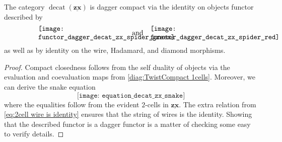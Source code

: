 \documentclass[a4paper,UKenglish]{lipics-v2016}
\begin{document}
\begin{theorem}
	\label{thm:decat zx is dagger compact}
	The category $\operatorname{decat}(\underline{\mathbf{zx}})$ is dagger compact via the identity on objects functor described by 
	\[
		\begin{minipage}{0.3\textwidth}
			\texttt{[image: functor\_dagger\_decat\_zx\_spider\_green]}
		\end{minipage}
		\quad \quad \quad \text{and} \quad
		\begin{minipage}{0.3\textwidth}
			\texttt{[image: functor\_dagger\_decat\_zx\_spider\_red]}
		\end{minipage}
	\]
	as well as by identity on the wire, Hadamard, and diamond morphisms.
\end{theorem}
\begin{proof}
	Compact closedness follows from the self duality of objects via the evaluation and coevaluation maps from \eqref{diag:TwistCompact 1cells}. Moreover, we can derive the snake equation
	\[
	\texttt{[image: equation\_decat\_zx\_snake]}
	\]
	where the equalities follow from the evident $2$-cells in $\underline{\mathbf{zx}}$. The extra relation from \eqref{eq:2cell wire is identity} ensures that the string of wires is the identity.  Showing that the described functor is a dagger functor is a matter of checking some easy to verify details. 
\end{proof}
\end{document}

